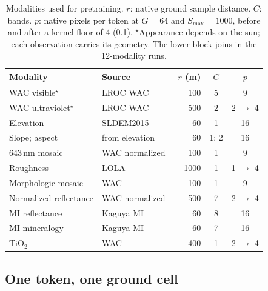 \begin{table}[t]
  \centering
  \footnotesize
  \setlength{\tabcolsep}{2.1pt}
  \caption{Modalities used for pretraining. $r$: native ground sample distance. $C$: bands. $p$: native pixels per token at $G{=}64$ and $S_{\max}{=}1000$, before and after a kernel floor of 4 (\cref{sec:tokens}). $^\star$Appearance depends on the sun; each observation carries its geometry. The lower block joins in the 12-modality runs.}
  \label{tab:modalities}
  \begin{tabular}{@{}llrcc@{}}
    \toprule
    Modality & Source & $r$ (m) & $C$ & $p$ \\
    \midrule
    WAC visible$^\star$       & LROC WAC~\cite{robinson2010lunar}      & 100  & 5    & 9 \\
    WAC ultraviolet$^\star$   & LROC WAC                               & 500  & 2    & 2 $\to$ 4 \\
    Elevation                 & SLDEM2015~\cite{barker2016new}         & 60   & 1    & 16 \\
    Slope; aspect             & from elevation                         & 60   & 1; 2 & 16 \\
    643\,nm mosaic            & WAC normalized~\cite{boyd2012lunar}    & 100  & 1    & 9 \\
    Roughness                 & LOLA~\cite{kreslavsky2013lunar}        & 1000 & 1    & 1 $\to$ 4 \\
    \midrule
    Morphologic mosaic        & WAC~\cite{speyerer2011lunar}           & 100  & 1    & 9 \\
    Normalized reflectance    & WAC normalized~\cite{boyd2012lunar}    & 500  & 7    & 2 $\to$ 4 \\
    MI reflectance            & Kaguya MI~\cite{lemelin2016global}     & 60   & 8    & 16 \\
    MI mineralogy             & Kaguya MI~\cite{lemelin2016global}     & 60   & 7    & 16 \\
    TiO$_2$                   & WAC~\cite{sato2017lunar}               & 400  & 1    & 2 $\to$ 4 \\
    \bottomrule
  \end{tabular}
\end{table}

\subsection{One token, one ground cell}
\label{sec:tokens}

